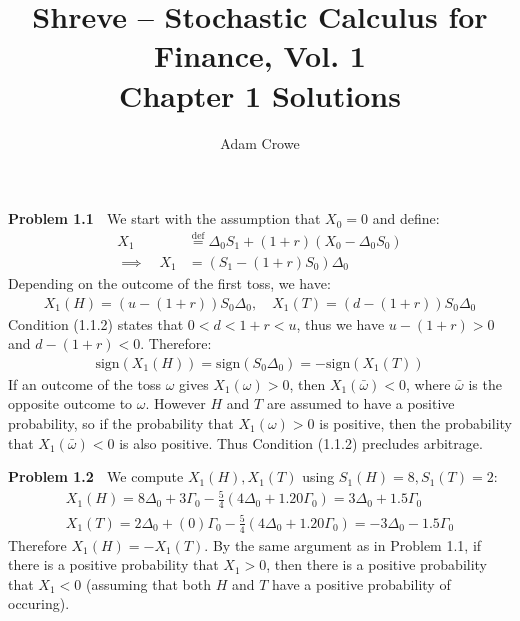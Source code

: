 \documentclass[12pt, letterpaper]{article}
\author{Adam Crowe}
\title{Shreve -- Stochastic Calculus for Finance, Vol. 1 \\ Chapter 1 Solutions}
\begin{document}
\maketitle

\vspace{5mm}
\noindent
\textbf{Problem 1.1} $\;$ We start with the assumption that $X_0 = 0$ and define:
\begin{align*}
    X_1 &\overset{\text{def}}= \Delta_0 S_1 + (1+r)(X_0 - \Delta_0 S_0) \\
    \implies \quad X_1 &= \left( S_1 - (1+r)S_0 \right) \Delta_0
\end{align*}
Depending on the outcome of the first toss, we have:
\begin{align*}
    X_1(H) = \left( u - (1+r) \right) S_0 \Delta_0, \quad
    X_1(T) = \left( d - (1+r) \right) S_0 \Delta_0
\end{align*}
Condition (1.1.2) states that $0 < d < 1 + r < u$, thus we have $u - (1+r) > 0$ and $d-(1+r) < 0$.
Therefore:
\begin{gather*}
    \text{sign}\left( X_1(H) \right) = \text{sign}\left( S_0 \Delta_0 \right) = - \text{sign}\left( X_1(T) \right)
\end{gather*}
If an outcome of the toss $\omega$ gives $X_1(\omega) > 0$, then $X_1(\bar \omega) < 0$, where $\bar \omega$ is the opposite outcome to $\omega$.
However $H$ and $T$ are assumed to have a positive probability, so if the probability that $X_1(\omega) > 0$ is positive, then the probability that $X_1(\bar \omega) < 0$ is also positive.
Thus Condition (1.1.2) precludes arbitrage.

\vspace{5mm}
\noindent
\textbf{Problem 1.2} $\;$ We compute $X_1(H), X_1(T)$ using $S_1(H)=8, S_1(T)=2$:
\begin{gather*}
    X_1(H) = 8\Delta_0 + 3\Gamma_0 - \tfrac{5}{4}(4 \Delta_0 + 1.20 \Gamma_0) = 3 \Delta_0 + 1.5 \Gamma_0 \\
    X_1(T) = 2\Delta_0 + (0)\Gamma_0 - \tfrac{5}{4}(4 \Delta_0 + 1.20 \Gamma_0) = - 3 \Delta_0 - 1.5 \Gamma_0
\end{gather*}
Therefore $X_1(H) = - X_1(T)$.
By the same argument as in Problem 1.1, if there is a positive probability that $X_1 > 0$, then there is a positive probability that $X_1 < 0$ (assuming that both $H$ and $T$ have a positive probability of occuring).
\end{document}
